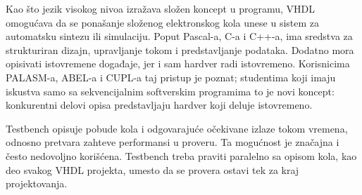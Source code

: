 Kao što jezik visokog nivoa izražava složen koncept u programu, VHDL omogućava da se ponašanje složenog elektronskog kola unese u sistem za automatsku sintezu ili simulaciju. Poput Pascal-a, C-a i C++-a, ima sredstva za strukturiran dizajn, upravljanje tokom i predstavljanje podataka. Dodatno mora opisivati istovremene događaje, jer i sam hardver radi istovremeno. Korisnicima PALASM-a, ABEL-a i CUPL-a taj pristup je poznat; studentima koji imaju iskustva samo sa sekvencijalnim softverskim programima to je novi koncept: konkurentni delovi opisa predstavljaju hardver koji deluje istovremeno.

Testbench opisuje pobude kola i odgovarajuće očekivane izlaze tokom vremena, odnosno pretvara zahteve performansi u proveru. Ta mogućnost je značajna i često nedovoljno korišćena. Testbench treba praviti paralelno sa opisom kola, kao deo svakog VHDL projekta, umesto da se provera ostavi tek za kraj projektovanja.
